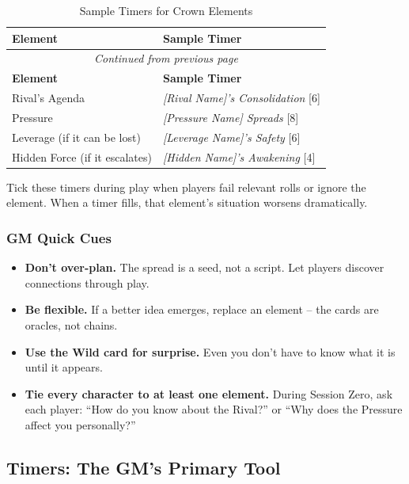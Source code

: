 \begin{center}
\begin{longtable}{ll}
\caption{Sample Timers for Crown Elements}\\
\toprule
\textbf{Element} & \textbf{Sample Timer } \\
\midrule
\endfirsthead
\multicolumn{2}{c}{\emph{Continued from previous page}} \\
\toprule
\textbf{Element} & \textbf{Sample Timer } \\
\midrule
\endhead
\bottomrule
\endfoot
Rival's Agenda & \textit{[Rival Name]'s Consolidation} [6] \\
Pressure & \textit{[Pressure Name] Spreads} [8] \\
Leverage (if it can be lost) & \textit{[Leverage Name]'s Safety} [6] \\
Hidden Force (if it escalates) & \textit{[Hidden Name]'s Awakening} [4] \\
\end{longtable}
\end{center}

Tick these timers during play when players fail relevant rolls or ignore the element. When a timer fills, that element's situation worsens dramatically.

\subsubsection{GM Quick Cues}
\begin{itemize}
  \item \textbf{Don't over-plan.} The spread is a seed, not a script. Let players discover connections through play.
  \item \textbf{Be flexible.} If a better idea emerges, replace an element -- the cards are oracles, not chains.
  \item \textbf{Use the Wild card for surprise.} Even you don't have to know what it is until it appears.
  \item \textbf{Tie every character to at least one element.} During Session Zero, ask each player: ``How do you know about the Rival?'' or ``Why does the Pressure affect you personally?''
\end{itemize}

\subsection{Timers: The GM's Primary Tool}


